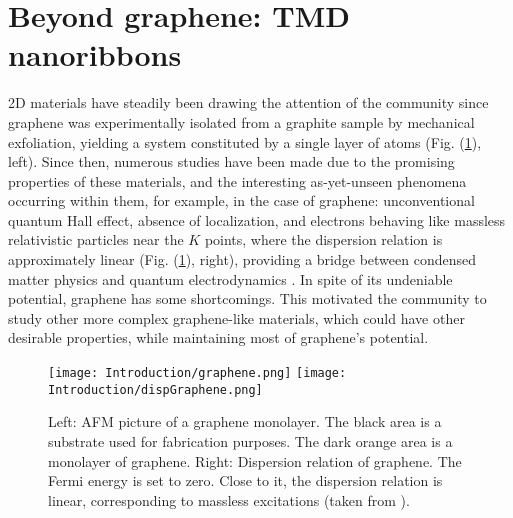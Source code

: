\section{Beyond graphene: TMD nanoribbons}
\label{sec:state}

\ac{2D} materials have steadily been drawing the attention of the community since graphene was experimentally isolated from a graphite sample by mechanical exfoliation, yielding a system constituted by a single layer of atoms (Fig. (\ref{fig:graphene}), left).
Since then, numerous studies have been made due to the promising properties of these materials, and the interesting as-yet-unseen phenomena occurring within them, for example, in the case of graphene: unconventional quantum Hall effect, absence of localization, and electrons behaving like massless relativistic particles near the $K$ points, where the dispersion relation is approximately linear (Fig. (\ref{fig:graphene}), right), providing a bridge between condensed matter physics and quantum electrodynamics \cite{katsnelson_graphene:_2007}.
In spite of its undeniable potential, graphene has some shortcomings.
This motivated the community to study other more complex graphene-like materials, which could have other desirable properties, while maintaining most of graphene's potential.

\begin{figure}[H]
\hspace{1.5cm}
\texttt{[image: Introduction/graphene.png]}
\hspace{2cm}
\texttt{[image: Introduction/dispGraphene.png]}
\caption[Graphene monolayer; graphene's dispersion relation.]{Left: \acf{AFM} picture of a graphene monolayer. The black area is a substrate used for fabrication purposes. The dark orange area is a monolayer of graphene. Right: Dispersion relation of graphene. The Fermi energy is set to zero. Close to it, the dispersion relation is linear, corresponding to massless excitations (taken from \cite{castro_neto_electronic_2009}). }
\label{fig:graphene}
\end{figure}	

